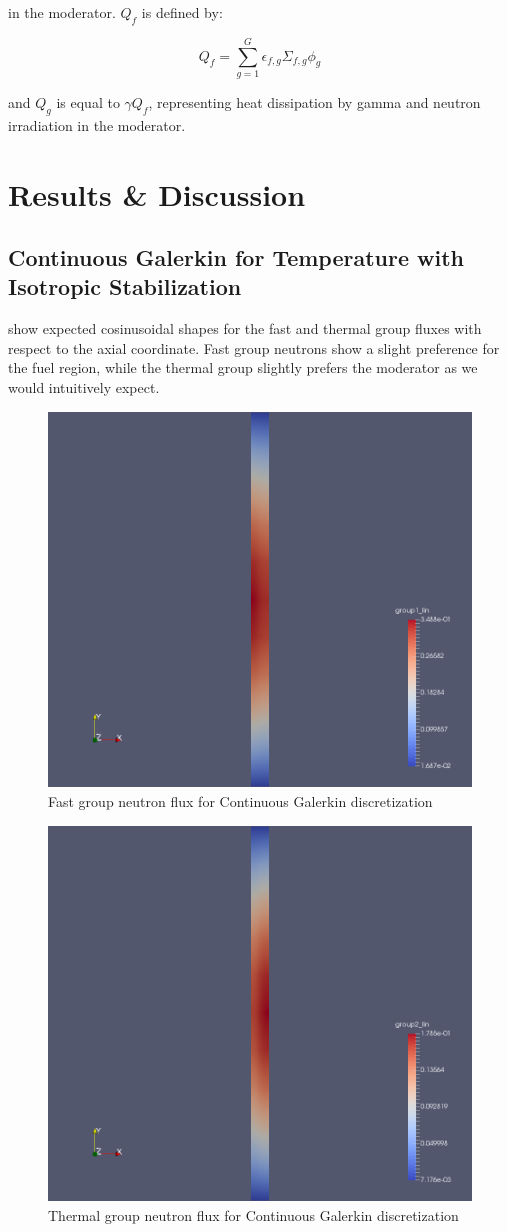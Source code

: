 \documentclass{article}
\let\Oldsection\section
\renewcommand{\section}{\FloatBarrier\Oldsection}
\let\Oldsubsection\subsection
\renewcommand{\subsection}{\FloatBarrier\Oldsubsection}
\begin{document}
in the moderator. $Q_f$ is defined by:

\begin{equation}
  Q_f = \sum_{g=1}^G \epsilon_{f,g}\Sigma_{f,g}\phi_g
  \label{eq:fuel_source}
\end{equation}

and $Q_g$ is equal to $\gamma Q_f$, representing heat dissipation by gamma and
neutron irradiation in the moderator.

\section{Results \& Discussion}

\subsection{Continuous Galerkin for Temperature with Isotropic Stabilization}

 show expected cosinusoidal shapes for the
fast and thermal group fluxes with respect to the axial coordinate. Fast group neutrons
show a slight preference for the fuel region, while the thermal group slightly
prefers the moderator as we would intuitively expect.

\begin{figure}[htpb]
  \centering
  \includegraphics[width=.5\textwidth]{nt_group_1.png}
  \caption{Fast group neutron flux for Continuous Galerkin discretization}
  \label{fig:cg_group1}
\end{figure}

\begin{figure}[htpb]
  \centering
  \includegraphics[width=.5\textwidth]{nt_group_2.png}
  \caption{Thermal group neutron flux for Continuous Galerkin discretization}
  \label{fig:cg_group2}
\end{figure}
\end{document}
